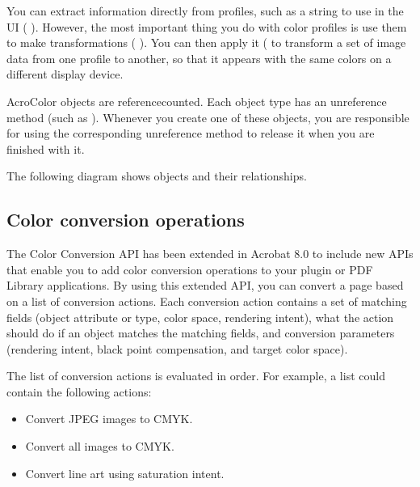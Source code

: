 \documentclass[letterpaper,12pt,english,openany,oneside]{sphinxmanual}
\begin{document}
You can extract information directly from profiles, such as a string to use in the UI ( ). However, the most important thing you do with color profiles is use them to make transformations ( ). You can then apply it ( to transform a set of image data from one profile to another, so that it appears with the same colors on a different display device.

AcroColor objects are reference\sphinxhyphen{}counted. Each object type has an unreference method (such as  ). Whenever you create one of these objects, you are responsible for using the corresponding unreference method to release it when you are finished with it.

The following diagram shows objects and their relationships.

\noindent{}


\subsection{Color conversion operations}
\label{\detokenize{Plugins_ExtendedAPI:color-conversion-operations}}
The Color Conversion API has been extended in Acrobat 8.0 to include new APIs that enable you to add color conversion operations to your plugin or PDF Library applications. By using this extended API, you can convert a page based on a list of conversion actions. Each conversion action contains a set of matching fields (object attribute or type, color space, rendering intent), what the action should do if an object matches the matching fields, and conversion parameters (rendering intent, black point compensation, and target color space).

The list of conversion actions is evaluated in order. For example, a list could contain the following actions:
\begin{itemize}
\item {} 
Convert JPEG images to CMYK.

\item {} 
Convert all images to CMYK.

\item {} 
Convert line art using saturation intent.

\end{itemize}
\end{document}

